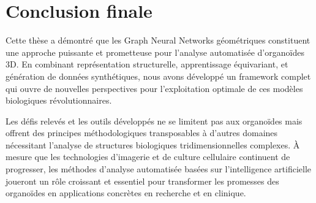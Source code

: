 \section*{Conclusion finale}

Cette thèse a démontré que les Graph Neural Networks géométriques constituent une approche puissante et prometteuse pour l'analyse automatisée d'organoïdes 3D. En combinant représentation structurelle, apprentissage équivariant, et génération de données synthétiques, nous avons développé un framework complet qui ouvre de nouvelles perspectives pour l'exploitation optimale de ces modèles biologiques révolutionnaires.

Les défis relevés et les outils développés ne se limitent pas aux organoïdes mais offrent des principes méthodologiques transposables à d'autres domaines nécessitant l'analyse de structures biologiques tridimensionnelles complexes. À mesure que les technologies d'imagerie et de culture cellulaire continuent de progresser, les méthodes d'analyse automatisée basées sur l'intelligence artificielle joueront un rôle croissant et essentiel pour transformer les promesses des organoïdes en applications concrètes en recherche et en clinique.
